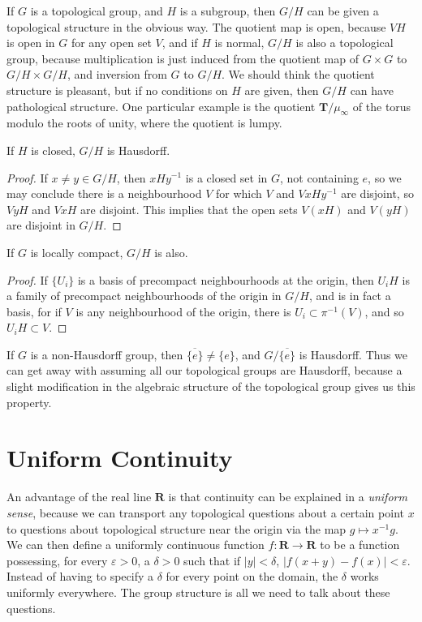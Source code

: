 If $G$ is a topological group, and $H$ is a subgroup, then $G/H$ can be given a topological structure in the obvious way. The quotient map is open, because $VH$ is open in $G$ for any open set $V$, and if $H$ is normal, $G/H$ is also a topological group, because multiplication is just induced from the quotient map of $G \times G$ to $G/H \times G/H$, and inversion from $G$ to $G/H$. We should think the quotient structure is pleasant, but if no conditions on $H$ are given, then $G/H$ can have pathological structure. One particular example is the quotient $\mathbf{T}/\mu_\infty$ of the torus modulo the roots of unity, where the quotient is lumpy.

\begin{theorem}
    If $H$ is closed, $G/H$ is Hausdorff.
\end{theorem}
\begin{proof}
    If $x \neq y \in G/H$, then $xHy^{-1}$ is a closed set in $G$, not containing $e$, so we may conclude there is a neighbourhood $V$ for which $V$ and $VxHy^{-1}$ are disjoint, so $VyH$ and $VxH$ are disjoint. This implies that the open sets $V(xH)$ and $V(yH)$ are disjoint in $G/H$.
\end{proof}

\begin{theorem}
    If $G$ is locally compact, $G/H$ is also.
\end{theorem}
\begin{proof}
    If $\{ U_i \}$ is a basis of precompact neighbourhoods at the origin, then $U_iH$ is a family of precompact neighbourhoods of the origin in $G/H$, and is in fact a basis, for if $V$ is any neighbourhood of the origin, there is $U_i \subset \pi^{-1}(V)$, and so $U_iH \subset V$.
\end{proof}

If $G$ is a non-Hausdorff group, then $\overline{\{e\}} \neq \{ e \}$, and $G/\overline{\{e\}}$ is Hausdorff. Thus we can get away with assuming all our topological groups are Hausdorff, because a slight modification in the algebraic structure of the topological group gives us this property.

\section{Uniform Continuity}

An advantage of the real line $\mathbf{R}$ is that continuity can be explained in a {\it uniform sense}, because we can transport any topological questions about a certain point $x$ to questions about topological structure near the origin via the map $g \mapsto x^{-1}g$. We can then define a uniformly continuous function $f: \mathbf{R} \to \mathbf{R}$ to be a function possessing, for every $\varepsilon > 0$, a $\delta > 0$ such that if $|y| < \delta$, $|f(x+y) - f(x)|<\varepsilon$. Instead of having to specify a $\delta$ for every point on the domain, the $\delta$ works uniformly everywhere. The group structure is all we need to talk about these questions.

